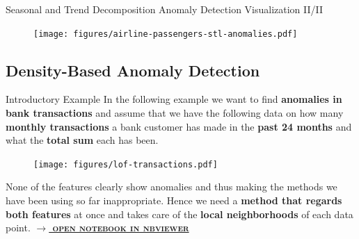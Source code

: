 \documentclass[document.tex]{subfiles}
\begin{document}
    \begin{frame}{Seasonal and Trend Decomposition Anomaly Detection Visualization II/II}
        \begin{figure}
            \label{fig:airline-passengers-stl-anomalies}
            \texttt{[image: figures/airline-passengers-stl-anomalies.pdf]}
        \end{figure}
    \end{frame}
   
    \subsection{Density-Based Anomaly Detection}
    
    \begin{frame}{Introductory Example}
        In the following example we want to find \textbf{anomalies in bank transactions} and assume that we have the following data on how many \textbf{monthly transactions} a bank customer has made in the \textbf{past 24 months} and what the \textbf{total sum} each has been.
        
        \begin{figure}
            \label{fig:lof-transactions}
            \texttt{[image: figures/lof-transactions.pdf]}
        \end{figure}
    
        None of the features clearly show anomalies and thus making the methods we have been using so far inappropriate. Hence we need a \textbf{method that regards both features} at once and takes care of the \textbf{local neighborhoods} of each data point. \href{https://nbviewer.jupyter.org/github/saschaschworm/big-data-and-data-science/blob/master/notebooks/demos/transactions-lof.ipynb}{\textsc{\textbf{$\rightarrow$ open notebook in nbviewer}}}
    \end{frame}
\end{document}
